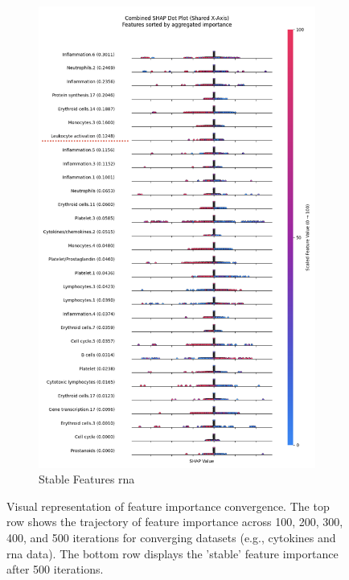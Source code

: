 \documentclass[12pt,a4paper]{report}
\begin{document}
\begin{figure}[h!]
\begin{subfigure}[b]{0.48\textwidth}
        \includegraphics[width=\textwidth]{images/stable_features_RNA.png}
        \caption{Stable Features \acrshort{rna}}
        \label{fig:stable_features_RNA}
    \end{subfigure}
    
    \caption[Feature Importance Trajectories and Stable Features 2]{Visual representation of feature importance convergence. The top row shows the trajectory of feature importance across 100, 200, 300, 400, and 500 iterations for converging datasets (e.g., cytokines and \acrshort{rna} data). The bottom row displays the 'stable' feature importance after 500 iterations.}
    \label{fig:feature_trajectories_plots2}
\end{figure}
\end{document}
